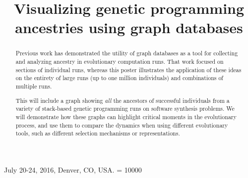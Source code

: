 \documentclass{sig-alternate}
\begin{document}
 {July 20-24, 2016, Denver, CO, USA.}
\widowpenalty = 10000
    
\title{Visualizing genetic programming ancestries using graph databases}

%
\maketitle

\begin{abstract}


Previous work has demonstrated the utility of graph databases as a tool for collecting and analyzing ancestry in evolutionary computation runs. That work focused on sections of individual runs, whereas this poster illustrates the application of these ideas on the entirety of large runs (up to one million individuals) and combinations of multiple runs.

This will include a graph showing \emph{all} the ancestors of successful individuals from a variety of stack-based genetic programming runs on software synthesis problems. We will demonstrate how these graphs can highlight critical moments in the evolutionary process, and use them to compare the dynamics when using different evolutionary tools, such as different selection mechanisms or representations.

\end{abstract}
\end{document}
